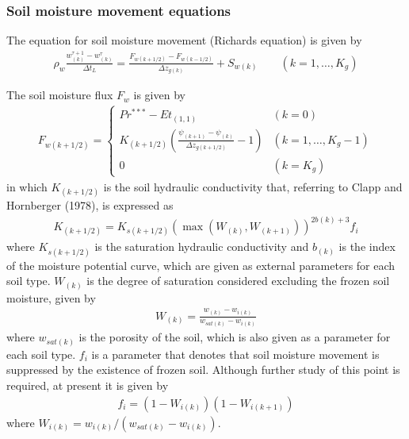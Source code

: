 \hypertarget{soil-moisture-movement-equations}{%
\subsubsection{Soil moisture movement equations}\label{soil-moisture-movement-equations}}

The equation for soil moisture movement (Richards equation) is given by \begin{eqnarray}
\rho_w \frac{w_{(k)}^{\tau+1} - w_{(k)}^{\tau}}{\Delta t_L} =
\frac{F_{w(k+1/2)} - F_{w(k-1/2)}}{\Delta z_{g(k)}} + S_{w(k)}
\qquad (k=1,\ldots,K_{g}) \label{eq299}
\end{eqnarray}

The soil moisture flux \(F_{w}\) is given by \begin{eqnarray}
 F_{w(k+1/2)} =
\left\{
\begin{array}{ll}
Pr^{*** } - Et_{(1,1)}
 & (k=0)\\
\displaystyle{
K_{(k+1/2)} \left(\frac{\psi_{(k+1)} - \psi_{(k)}}{\Delta z_{g(k+1/2)}} - 1 \right)
}
 & (k=1,\ldots,K_{g}-1) \\
\displaystyle{
0
}
 & (k=K_{g})
\end{array}
\right. \label{eq300}
\end{eqnarray} in which \(K_{(k+1/2)}\) is the soil hydraulic conductivity that, referring to Clapp and Hornberger (1978), is expressed as \begin{eqnarray}
 K_{(k+1/2)} = K_{s(k+1/2)} (\max(W_{(k)},W_{(k+1)}))^{2b(k)+3} f_i
\end{eqnarray} where \(K_{s(k+1/2)}\) is the saturation hydraulic conductivity and \(b_{(k)}\) is the index of the moisture potential curve, which are given as external parameters for each soil type. \(W_{(k)}\)
is the degree of saturation considered excluding the frozen soil moisture, given by \begin{eqnarray}
 W_{(k)} = \frac{w_{(k)}-w_{i(k)}}{w_{sat(k)}-w_{i(k)}}
\end{eqnarray} where \(w_{sat(k)}\) is the porosity of the soil, which is also given as a parameter for each soil type. \(f_i\) is a parameter that denotes that soil moisture movement is suppressed by the
existence of frozen soil. Although further study of this point is required, at present it is given by \begin{eqnarray}
 f_i = \left(1- W_{i(k)}\right)
       \left(1- W_{i(k+1)}\right)
\end{eqnarray} where \(W_{i(k)} = w_{i(k)}/(w_{sat(k)}-w_{i(k)})\).

